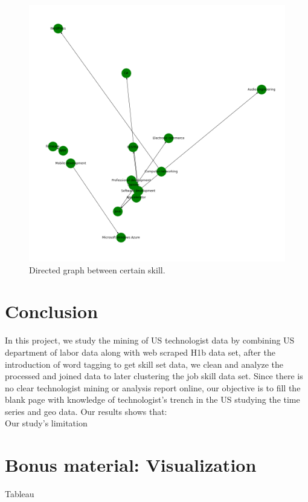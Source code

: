 \begin{figure}[h]
	\begin{center}
		\includegraphics[width=\linewidth]{./photos/knowledgearrow2.png}
	\end{center}
	\caption{Directed graph between certain skill.}
\end{figure}
\section{Conclusion}
In this project, we study the mining of US technologist data by combining US department of labor data along with web scraped H1b data set, after the introduction of word tagging to get skill set data, we clean and analyze the processed and joined data to later clustering the job skill data set. Since there is no clear technologist mining or analysis report online, our objective is to fill the blank page with knowledge of technologist's trench in the US studying the time series and geo data. Our results shows that:\\
Our study's limitation 
\section{Bonus material: Visualization}
Tableau






